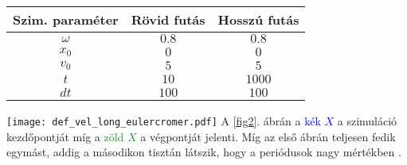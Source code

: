 \begin{multicols}{2}
\begin{center}
\begin{tabular}{c|c|c}
Szim. paraméter & Rövid futás & Hosszú futás \\
\hline \hline
$\omega$ & $0.8$ & $0.8$ \\
\hline
$x_{0}$ & $0$ & $0$ \\
\hline
$v_{0}$ & $5$ & $5$ \\
\hline
$t$ & $10$ & $1000$ \\
\hline
$dt$ & $100$ & $100$ \\
\hline
\end{tabular}
\end{center}
\label{tab3}
\hfill \break \hfill \break
{\centering\texttt{[image: def\_vel\_long\_eulercromer.pdf]}}
\label{fig2}
\hfill \break \hfill \break
A \ref{fig2}. ábrán a \textcolor{blue}{kék $X$} a szimuláció kezdőpontját míg a \textcolor{ForestGreen}{zöld $X$} a végpontját jelenti. Míg az első ábrán teljesen fedik egymást, addig a másodikon tisztán látszik, hogy a periódusok nagy mértékben .


\end{multicols}
